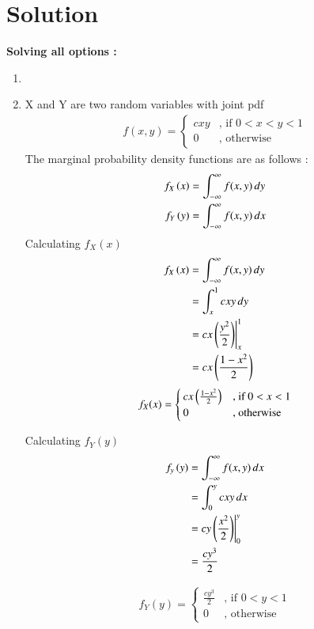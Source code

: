\documentclass[journal,12pt,twocolumn]{IEEEtran}
\begin{document}
\section*{Solution}
\textbf{Solving all options : }
\begin{enumerate}
    \item 
    \item
X and Y are two random variables with joint pdf 
\begin{align}
\label{eq:: joint_pdf}
f(x,y)  = 
\begin{cases}
cxy & \text{, if } 0<x<y<1
\\
0 & \text{, otherwise }
\end{cases}
\end{align}
The marginal probability density functions are as follows : 
\begin{align}
    f_X\left(x\right) &=  \int_{-\infty}^{\infty} f(x,y) \,dy \\
    f_Y\left(y\right) &=  \int_{-\infty}^{\infty} f(x,y) \,dx
\end{align}
Calculating $ f_X(x) $
\begin{align}
    f_X\left(x\right) &=  \int_{-\infty}^{\infty} f(x,y) \,dy \\
    &= \int_{x}^{1} cxy \,dy \\
    &= cx \left(\frac{y^2}{2}\right) \Biggr|_{x}^{1} \\
    &= cx \left(\frac{1- x^2}{2}\right)
\end{align}
 \begin{align}
\label{eq:: pdfx}
f_X(x)  = 
\begin{cases}
cx \left(\frac{1- x^2}{2}\right) & \text{, if } 0<x<1
\\
0 & \text{, otherwise }
\end{cases}
\end{align} 

Calculating $ f_Y(y) $
\begin{align}
    f_y\left(y\right) &=  \int_{-\infty}^{\infty} f(x,y) \,dx \\
    &= \int_{0}^{y} cxy \,dx \\
    &= cy \left(\frac{x^2}{2}\right) \Biggr|_{0}^{y} \\
    &= \frac{ cy^3}{2}
\end{align}

 \begin{align}
\label{eq:: pdfy}
f_Y(y)  = 
\begin{cases}
\frac{ cy^3}{2} & \text{, if } 0<y<1
\\
0 & \text{, otherwise }
\end{cases}
\end{align}   


\end{enumerate}
\end{document}
